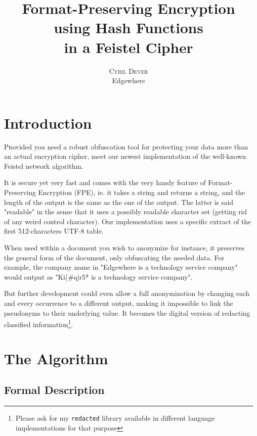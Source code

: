 \documentclass[twoside,twocolumn]{article}
\title{Format-Preserving Encryption \\using Hash Functions \\in a Feistel Cipher} %
\author{%
    \textsc{Cyril Dever}\\ %
    \normalsize Edgewhere \\ %
}
\date{\DTMusedate{thedate}}
\theoremstyle{definition}
\theoremstyle{remark}
\begin{document}
\maketitle


\section{Introduction}

\lettrine[nindent=0em,lines=3]{P}rovided you need a robust obfuscation tool for protecting your data more than an actual encryption cipher, meet our 
newest implementation of the well-known Feistel network algorithm.

It is secure yet very fast and comes with the very handy feature of Format-Preserving Encryption (FPE), ie. it takes a string and returns a string, 
and the length of the output is the same as the one of the output. The latter is said "readable" in the sense that it uses a possibly readable 
character set (getting rid of any weird control character). Our implementation uses a specific extract of the first 512-characters UTF-8 table.

When used within a document you wish to anonymize for instance, it preserves the general form of the document, only obfuscating the needed data.
For example, the company name in "Edgewhere is a technology service company" would output as "Ki(\#q|r5* is a technology service company".

But further development could even allow a full anonymization by changing each and every occurrence to a different output, making it impossible to link 
the pseudonyms to their underlying value. It becomes the digital version of redacting classified information\footnote{Please ask for my 
\texttt{redacted} library available in different language implementations for that purpose}.

\section{The Algorithm}

\subsection{Formal Description}
\end{document}

